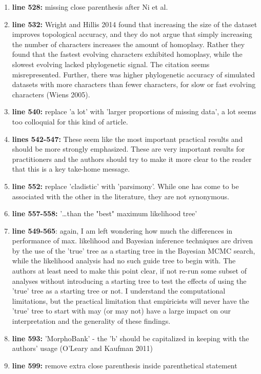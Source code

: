\documentclass[12pt,letterpaper]{article}
\begin{document}
\begin{enumerate}
\item{\textbf{line 528:}} missing close parenthesis after Ni et al.
\item{\textbf{line 532:}} Wright and Hillis 2014 found that increasing the size of the dataset improves topological accuracy, and they do not argue that simply increasing the number of characters increases the amount of homoplasy. Rather they found that the fastest evolving characters exhibited homoplasy, while the slowest evolving lacked phylogenetic signal. The citation seems misrepresented. Further, there was higher phylogenetic accuracy of simulated datasets with more characters than fewer characters, for slow or fast evolving characters (Wiens 2005).
\item{\textbf{line 540:}} replace 'a lot' with 'larger proportions of missing data', a lot seems too colloquial for this kind of article. 
\item{\textbf{lines 542-547:}} These seem like the most important practical results and should be more strongly emphasized. These are very important results for practitioners and the authors should try to make it more clear to the reader that this is a key take-home message.
\item{\textbf{line 552:}} replace 'cladistic' with 'parsimony'. While one has come to be associated with the other in the literature, they are not synonymous. 
\item{\textbf{line 557-558:}} '…than the "best" maximum likelihood tree'
\item{\textbf{line 549-565}}: again, I am left wondering how much the differences in performance of max. likelihood and Bayesian inference techniques are driven by the use of the 'true' tree as a starting tree in the Bayesian MCMC search, while the likelihood analysis had no such guide tree to begin with. The authors at least need to make this point clear, if not re-run some subset of analyses without introducing a starting tree to test the effects of using the 'true' tree as a starting tree or not. I understand the computational limitations, but the practical limitation that empiricists will never have the 'true' tree to start with may (or may not) have a large impact on our interpretation and the generality of these findings. 
\item{\textbf{line 593:}} 'MorphoBank' - the 'b' should be capitalized in keeping with the authors' usage (O'Leary and Kaufman 2011)
\item{\textbf{line 599:}} remove extra close parenthesis inside parenthetical statement

\end{enumerate}
\end{document}
